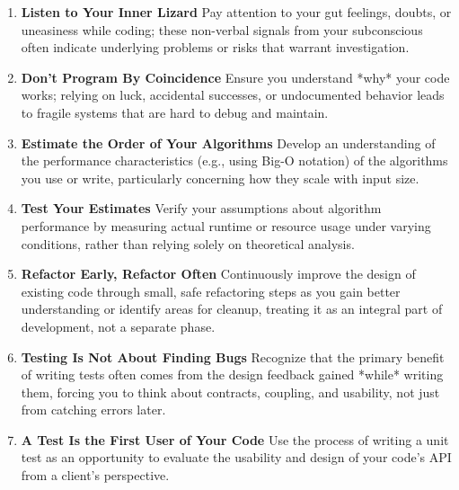 \documentclass[11pt]{article}
\begin{document}
\begin{tcolorbox}[pragchapterbox={Chapter 7: While You Are Coding}]
\begin{multicols}{2}
\begin{enumerate}[label=\arabic*., start=61, itemsep=1ex, topsep=0pt, partopsep=0pt, labelwidth=!, labelindent=0pt, leftmargin=*]
    \item \textbf{Listen to Your Inner Lizard}
    Pay attention to your gut feelings, doubts, or uneasiness while coding; these non-verbal signals from your subconscious often indicate underlying problems or risks that warrant investigation.

    \item \textbf{Don't Program By Coincidence}
    Ensure you understand *why* your code works; relying on luck, accidental successes, or undocumented behavior leads to fragile systems that are hard to debug and maintain.

    \item \textbf{Estimate the Order of Your Algorithms}
    Develop an understanding of the performance characteristics (e.g., using Big-O notation) of the algorithms you use or write, particularly concerning how they scale with input size.

    \item \textbf{Test Your Estimates}
    Verify your assumptions about algorithm performance by measuring actual runtime or resource usage under varying conditions, rather than relying solely on theoretical analysis.

    \item \textbf{Refactor Early, Refactor Often}
    Continuously improve the design of existing code through small, safe refactoring steps as you gain better understanding or identify areas for cleanup, treating it as an integral part of development, not a separate phase.

    \item \textbf{Testing Is Not About Finding Bugs}
    Recognize that the primary benefit of writing tests often comes from the design feedback gained *while* writing them, forcing you to think about contracts, coupling, and usability, not just from catching errors later.

    \item \textbf{A Test Is the First User of Your Code}
    Use the process of writing a unit test as an opportunity to evaluate the usability and design of your code's API from a client's perspective.


\end{enumerate}
\end{multicols}
\end{tcolorbox}
\end{document}
